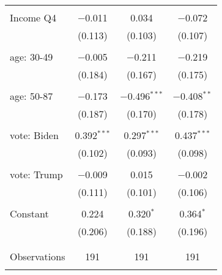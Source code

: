 \begin{tabular}{@{\extracolsep{5pt}}lccc}
  & & & \\ 
 Income Q4 & $-$0.011 & 0.034 & $-$0.072 \\ 
  & (0.113) & (0.103) & (0.107) \\ 
  & & & \\ 
 age: 30-49 & $-$0.005 & $-$0.211 & $-$0.219 \\ 
  & (0.184) & (0.167) & (0.175) \\ 
  & & & \\ 
 age: 50-87 & $-$0.173 & $-$0.496$^{***}$ & $-$0.408$^{**}$ \\ 
  & (0.187) & (0.170) & (0.178) \\ 
  & & & \\ 
 vote: Biden & 0.392$^{***}$ & 0.297$^{***}$ & 0.437$^{***}$ \\ 
  & (0.102) & (0.093) & (0.098) \\ 
  & & & \\ 
 vote: Trump & $-$0.009 & 0.015 & $-$0.002 \\ 
  & (0.111) & (0.101) & (0.106) \\ 
  & & & \\ 
 Constant & 0.224 & 0.320$^{*}$ & 0.364$^{*}$ \\ 
  & (0.206) & (0.188) & (0.196) \\ 
  & & & \\ 
\hline \\[-1.8ex] 

Observations & 191 & 191 & 191 \\ 
\hline 
\hline \\[-1.8ex] 
\end{tabular} 